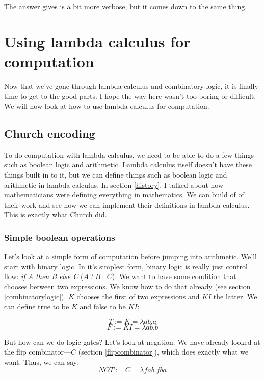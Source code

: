 \documentclass[11pt]{article}
\begin{document}
The answer \textcite{smullyan2000} gives is a bit more verbose, but it comes
down to the same thing.

\section{Using lambda calculus for computation}\label{computation}

Now that we've gone through lambda calculus and combinatory logic, it is
finally time to get to the good parts. I hope the way here wasn't too boring or
difficult. We will now look at how to use lambda calculus for computation.

\subsection{Church encoding}

To do computation with lambda calculus, we need to be able to do a few things
such as boolean logic and arithmetic. Lambda calculus itself doesn't have these
things built in to it, but we can define things such as boolean logic and
arithmetic in lambda calculus. In section \ref{history}, I talked about how
mathematicians were defining everything in mathematics. We can build of of
their work and see how we can implement their definitions in lambda calculus.
This is exactly what Church did.


\subsubsection{Simple boolean operations}\label{boolops}

Let's look at a simple form of computation before jumping into arithmetic.
We'll start with binary logic. In it's simplest form, binary logic is really
just control flow: \emph{if A then B else C} (\(A\:?\:B\::\:C\)). We want to
have some condition that chooses between two expressions. We know how to do
that already (see section \ref{combinatorylogic}). \(K\) chooses the first of
two expressions and \(KI\) the latter. We can define true to be \(K\) and false
to be \(KI\):

\[T:=K=\lambda ab.a\]
\[F:=KI=\lambda ab.b\]

But how can we do logic gates? Let's look at negation. We have already looked
at the flip combinator---\(C\) (section \ref{flipcombinator}), which does
exactly what we want. Thus, we can say:
\[NOT:=C=\lambda fab.fba\]
\end{document}
